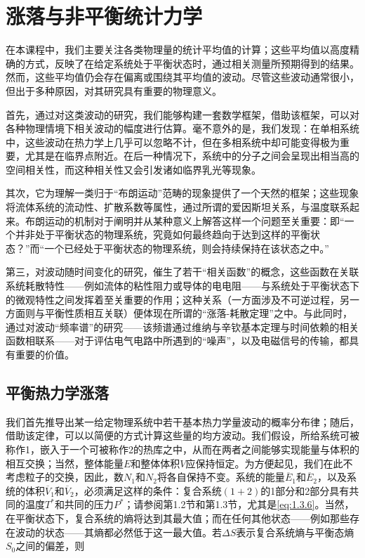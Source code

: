 ﻿
\chapter{涨落与非平衡统计力学}

在本课程中，我们主要关注各类物理量的统计平均值的计算；这些平均值以高度精确的方式，反映了在给定系统处于平衡状态时，通过相关测量所预期得到的结果。然而，这些平均值仍会存在偏离或围绕其平均值的波动。尽管这些波动通常很小，但出于多种原因，对其研究具有重要的物理意义。

首先，通过对这类波动的研究，我们能够构建一套数学框架，借助该框架，可以对各种物理情境下相关波动的幅度进行估算。毫不意外的是，我们发现：在单相系统中，这些波动在热力学上几乎可以忽略不计，但在多相系统中却可能变得极为重要，尤其是在临界点附近。在后一种情况下，系统中的分子之间会呈现出相当高的空间相关性，而这种相关性又会引发诸如临界乳光等现象。

其次，它为理解一类归于``布朗运动''范畴的现象提供了一个天然的框架；这些现象将流体系统的流动性、扩散系数等属性，通过所谓的爱因斯坦关系，与温度联系起来。布朗运动的机制对于阐明并从某种意义上解答这样一个问题至关重要：即``一个并非处于平衡状态的物理系统，究竟如何最终趋向于达到这样的平衡状态？''而``一个已经处于平衡状态的物理系统，则会持续保持在该状态之中。''

第三，对波动随时间变化的研究，催生了若干``相关函数''的概念，这些函数在关联系统耗散特性------例如流体的粘性阻力或导体的电电阻------与系统处于平衡状态下的微观特性之间发挥着至关重要的作用；这种关系（一方面涉及不可逆过程，另一方面则与平衡性质相互关联）便体现在所谓的``涨落-耗散定理''之中。与此同时，通过对波动``频率谱''的研究------该频谱通过维纳与辛钦基本定理与时间依赖的相关函数相联系------对于评估电气电路中所遇到的``噪声''，以及电磁信号的传输，都具有重要的价值。

\section{平衡热力学涨落}

我们首先推导出某一给定物理系统中若干基本热力学量波动的概率分布律；随后，借助该定律，可以以简便的方式计算这些量的均方波动。我们假设，所给系统可被称作1，嵌入于一个可被称作2的热库之中，从而在两者之间能够实现能量与体积的相互交换；当然，整体能量\(E\)和整体体积\(V\)应保持恒定。为方便起见，我们在此不考虑粒子的交换，因此，数\(N_{1}\)和\(N_{2}\)将各自保持不变。系统的能量\(\overline{E}_{1}\)和\(\overline{E}_{2}\)，以及系统的体积\(\overline{V}_{1}\)和\(\overline{V}_{2}\)，必须满足这样的条件：复合系统\((1+2)\)的1部分和2部分具有共同的温度\(T^{*}\)和共同的压力\(P^{*}\)；请参阅第1.2节和第1.3节，尤其是\autoref{eq:1.3.6}。当然，在平衡状态下，复合系统的熵将达到其最大值；而在任何其他状态------例如那些存在波动的状态------其熵都必然低于这一最大值。若\(\Delta S\)表示复合系统熵与平衡态熵\(S_{0}\)之间的偏差，则

